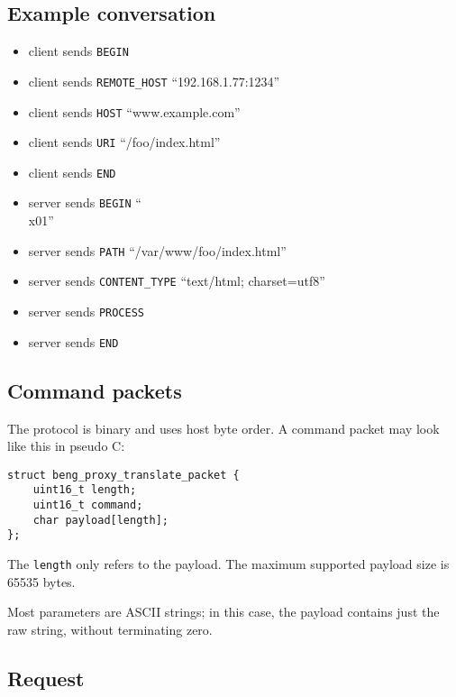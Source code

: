 \documentclass[a4paper,12pt]{article}
\begin{document}
\subsection{Example conversation}

\begin{itemize}
\item client sends \verb|BEGIN|
\item client sends \verb|REMOTE_HOST| ``192.168.1.77:1234''
\item client sends \verb|HOST| ``www.example.com''
\item client sends \verb|URI| ``/foo/index.html''
\item client sends \verb|END|
\item server sends \verb|BEGIN| ``\\x01''
\item server sends \verb|PATH| ``/var/www/foo/index.html''
\item server sends \verb|CONTENT_TYPE| ``text/html; charset=utf8''
\item server sends \verb|PROCESS|
\item server sends \verb|END|
\end{itemize}

\subsection{Command packets}

The protocol is binary and uses host byte order.  A command packet may
look like this in pseudo C:

\begin{verbatim}
struct beng_proxy_translate_packet {
    uint16_t length;
    uint16_t command;
    char payload[length];
};
\end{verbatim}

The \texttt{length} only refers to the payload.  The maximum supported
payload size is 65535 bytes.

Most parameters are ASCII strings; in this case, the payload contains
just the raw string, without terminating zero.

\subsection{Request}
\end{document}
